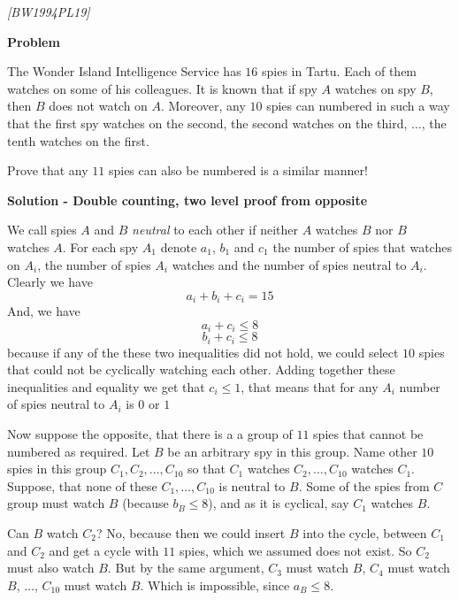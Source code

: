 
%
%

\renewcommand{\theenumi}{\alph{enumi}}



\noindent
 
\filbreak

\begin{problem}
\textit{[BW1994PL19]}


\textbf{Problem}

The Wonder Island Intelligence Service has $16$ spies in Tartu. Each of them watches on some of his colleagues. It is known that if spy $A$ watches on spy $B$, then $B$ does not watch on $A$. Moreover, any $10$ spies can numbered in such a way that the first spy watches on the second, the second watches on the third, $ \dots $, the tenth watches on the first. 

Prove that any $11$ spies can also be numbered is a similar manner!


\textbf{Solution - Double counting, two level proof from opposite}

We call spies $A$ and $B$ \textit{neutral} to each other if neither $A$ watches $B$ nor $B$ watches $A$. For each spy $A_1$ denote $a_1$, $b_1$ and $c_1$ the number of spies that watches on $A_i$, the number of spies $A_i$ watches and the number of spies neutral to $A_i$. Clearly we have
$$
a_i+b_i+c_i = 15
$$
And, we have 
$$
a_i+c_i \le 8
$$
$$
b_i+c_i \le 8
$$
because if any of the these two inequalities did not hold, we could select $10$ spies that could not be cyclically watching each other. Adding together these inequalities and equality we get that $c_i \le 1$, that means that for any $A_i$ number of spies neutral to $A_i$ is $0$ or $1$

Now suppose the opposite, that there is a a group of $11$ spies that cannot be numbered as required. Let $B$ be an arbitrary spy in this group. Name other $10$ spies in this group $C_1, C_2, \dots, C_{10}$ so that $C_1$ watches $C_2, \dots, C_{10}$ watches $C_1$. Suppose, that none of these $C_1, \dots, C_{10}$ is neutral to $B$. Some of the spies from $C$ group must watch $B$ (because $b_B \le 8$), and as it is cyclical, say $C_1$ watches $B$. 

Can $B$ watch $C_2$? No, because then we could insert $B$ into the cycle, between $C_1$ and $C_2$ and get a cycle with $11$ spies, which we assumed does not exist. So $C_2$ must also watch $B$. But by the same argument, $C_3$ must watch $B$, $C_4$ must watch $B$, $\dots$, $C_{10}$ must watch $B$. Which is impossible, since $a_B \le 8$. 


\end{problem}
